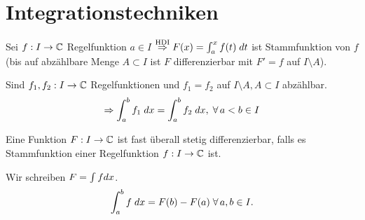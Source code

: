 \documentclass[../ana2.tex]{subfiles}
\begin{document}
\setcounter{section}{5}
\section{Integrationstechniken}
Sei \( \abb{f}{I}{\C} \) Regelfunktion \( a \in I\)
\( \oversett{HDI}{\Rightarrow} F(x) = \integralx{f(t)}{a}{x}{t} \)
ist Stammfunktion von \(f\) (bis auf abzählbare Menge 
\( A \subset I \) ist \(F\) differenzierbar mit 
\( F' = f \) auf \( I \setminus A \)).
\begin{bem}
    Sind \( f_1, f_2 : I \rightarrow \C \) Regelfunktionen
    und \(f_1 = f_2\) auf \( I \setminus A, A \subset I \) 
    abzählbar.
    \[ \Rightarrow \integral{f_1}{a}{b} = \integral{f_2}{a}{b},
    \; \forall a < b \in I \]
\end{bem}
\begin{defi}
    Eine Funktion \( \abb{F}{I}{\C} \) ist fast überall 
    stetig differenzierbar, falls es Stammfunktion einer 
    Regelfunktion \( \abb{f}{I}{\C} \) ist.
\end{defi}
\begin{notation}
    Wir schreiben \( F = \int f \dx{x} \).
    \[ \integral{f}{a}{b} = F(b) - F(a) \;\forall a,b\in I. \]
\end{notation}
\end{document}
